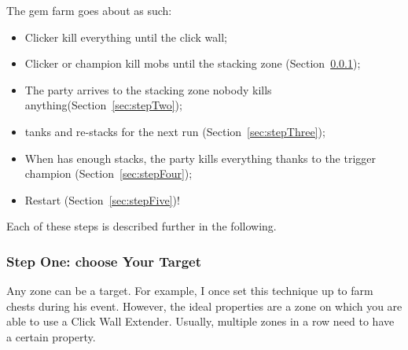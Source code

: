 \documentclass{article}
\begin{document}
The gem farm goes about as such:
\begin{itemize}
    \item Clicker kill everything until the click wall;
    \item Clicker or champion kill mobs until the stacking zone (Section~\ref{sec:stepOne});
    \item The party arrives to the stacking zone nobody kills anything(Section~\ref{sec:stepTwo});
    \item \briv tanks and re-stacks for the next run (Section~\ref{sec:stepThree});
    \item When \briv has enough stacks, the party kills everything thanks to the trigger champion (Section~\ref{sec:stepFour});
    \item Restart (Section~\ref{sec:stepFive})!
\end{itemize}

Each of these steps is described further in the following.

\subsubsection{Step One: choose Your Target}
\label{sec:stepOne}

Any zone can be a target.
For example, I once set this technique up to farm \briv chests during his event.
However, the ideal properties are a zone on which you are able to use a Click Wall Extender.
Usually, multiple zones in a row need to have a certain property.
\end{document}
